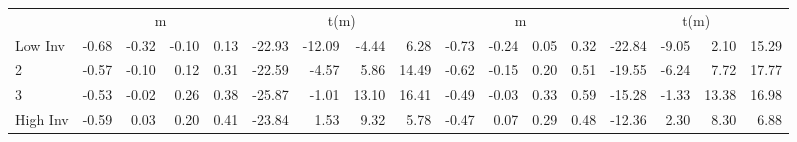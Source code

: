 \begin{table}[!ht]
\begin{tabular}{lrrrrrrrrrrrrrrrr}
  
    
      & \multicolumn{4}{c}{m} & \multicolumn{4}{c}{t(m)}
    
      & \multicolumn{4}{c}{m} & \multicolumn{4}{c}{t(m)}
    
    \\
      \cmidrule(r){2-5} \cmidrule(r){6-9} \cmidrule(r){10-13} \cmidrule(r){14-17}

    Low Inv   & -0.68  & -0.32  & -0.10  & 0.13  & -22.93  & -12.09  & -4.44  & 6.28  & -0.73  & -0.24  & 0.05  & 0.32  & -22.84  & -9.05  & 2.10  & 15.29  \\
           2  & -0.57  & -0.10  & 0.12  & 0.31  & -22.59  & -4.57  & 5.86  & 14.49  & -0.62  & -0.15  & 0.20  & 0.51  & -19.55  & -6.24  & 7.72  & 17.77  \\
           3  & -0.53  & -0.02  & 0.26  & 0.38  & -25.87  & -1.01  & 13.10  & 16.41  & -0.49  & -0.03  & 0.33  & 0.59  & -15.28  & -1.33  & 13.38  & 16.98  \\
    High Inv  & -0.59  & 0.03  & 0.20  & 0.41  & -23.84  & 1.53  & 9.32  & 5.78  & -0.47  & 0.07  & 0.29  & 0.48  & -12.36  & 2.30  & 8.30  & 6.88  \\

  

  \bottomrule
\end{tabular}
\label{tbl:32_Size_BM_Prior_C1997b}
\end{table}